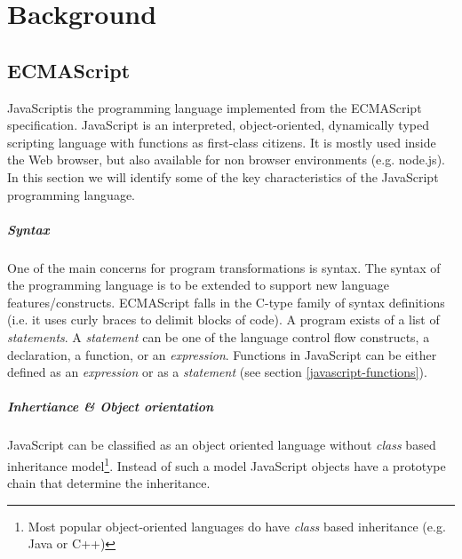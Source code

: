 
\chapter{Background} %

\label{Chapter2}


\section{ECMAScript}
JavaScript\footnotemark is the programming language implemented from the ECMAScript specification\cite{SpecJS}. JavaScript is an interpreted, object-oriented, dynamically typed scripting language with functions as first-class citizens. It is mostly used inside the Web browser, but also available for non browser environments (e.g. node.js). In this section we will identify some of the key characteristics of the JavaScript programming language. 

\paragraph{Syntax} \label{javascript-syntax}
One of the main concerns for program transformations is syntax. The syntax of the programming language is to be extended to support new language features/constructs. ECMAScript falls in the C-type family %
of syntax definitions (i.e. it uses curly braces to delimit blocks of code). 
A program exists of a list of \textit{statements}. A \textit{statement} can be one of the language control flow constructs, a declaration, a function, or an \textit{expression}. Functions in JavaScript can be either defined as an \textit{expression} or as a \textit{statement} (see section \ref{javascript-functions}).

\paragraph{Inhertiance \& Object orientation} \label{javascript-inheritance}
JavaScript can be classified as an object oriented language without \textit{class} based inheritance model\footnote{Most popular object-oriented languages do have \textit{class} based inheritance (e.g. Java or C++)}. Instead of such a model JavaScript objects have a prototype chain that determine the inheritance. 

